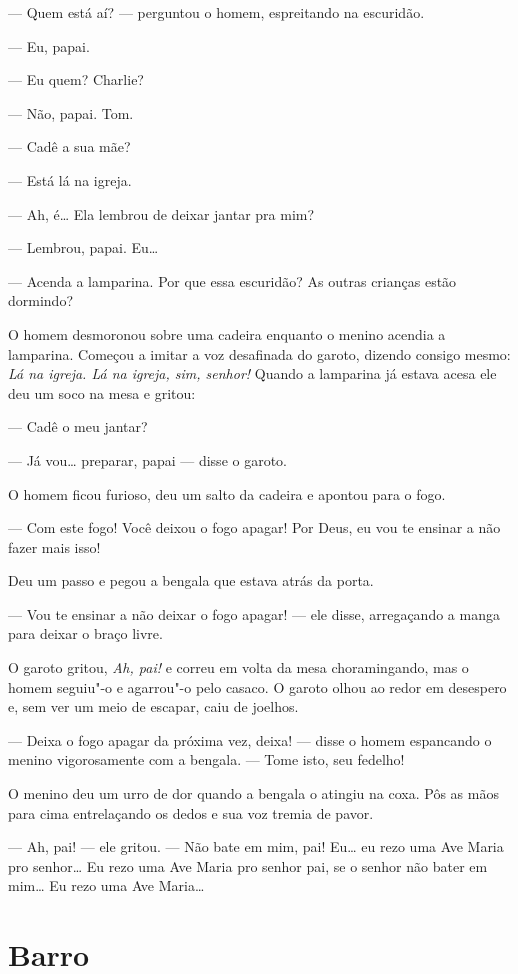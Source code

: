 --- Quem está aí? --- perguntou o homem, espreitando na escuridão.

--- Eu, papai.

--- Eu quem?  Charlie?

--- Não, papai.  Tom.

--- Cadê a sua mãe?

--- Está lá na igreja.

--- Ah, é\ldots{} Ela lembrou de deixar jantar pra mim?

--- Lembrou, papai.  Eu\ldots{}

--- Acenda a lamparina.  Por que essa escuridão?  As outras crianças estão
dormindo?

O homem desmoronou sobre uma cadeira enquanto o menino acendia a lamparina.
Começou a imitar a voz desafinada do garoto, dizendo consigo mesmo: \textit{Lá
na igreja.  Lá na igreja, sim, senhor!} Quando a lamparina já estava acesa ele
deu um soco na mesa e gritou:

--- Cadê o meu jantar?

--- Já vou\ldots{} preparar, papai --- disse o garoto.

O homem ficou furioso, deu um salto da cadeira e apontou para o fogo.

--- Com este fogo!  Você deixou o fogo apagar!  Por Deus, eu vou te ensinar a
não fazer mais isso!

Deu um passo e pegou a bengala que estava atrás da porta.

--- Vou te ensinar a não deixar o fogo apagar! --- ele disse, arregaçando a
manga para deixar o braço livre.

O garoto gritou, \textit{Ah, pai!} e correu em volta da mesa choramingando, mas
o homem seguiu"-o e agarrou"-o pelo casaco.  O garoto olhou ao redor em desespero
e, sem ver um meio de escapar, caiu de joelhos.

--- Deixa o fogo apagar da próxima vez, deixa! --- disse o homem espancando o
menino vigorosamente com a bengala.  --- Tome isto, seu fedelho!

O menino deu um urro de dor quando a bengala o atingiu na coxa.  Pôs as mãos
para cima entrelaçando os dedos e sua voz tremia de pavor.

--- Ah, pai! --- ele gritou.  --- Não bate em mim, pai!  Eu\ldots{} eu rezo uma
Ave Maria pro senhor\ldots{} Eu rezo uma Ave Maria pro senhor pai, se o senhor
não bater em mim\ldots{} Eu rezo uma Ave Maria\ldots{}


\chapter{Barro}

